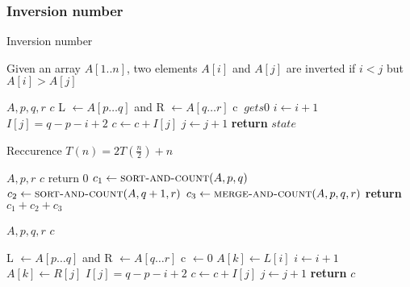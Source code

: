 \documentclass[../../main/main.tex]{subfiles}
\begin{document}
\subsubsection{Inversion number}
\begin{definition}{Inversion number}

	Given an array $A[1..n]$, two elements $A[i]$ and  $A[j]$ are inverted if $i<j$ but  $A[i] > A[j]$

\end{definition}
\begin{algorithm}
	\algrenewcommand{}
	\algrenewcommand{}
	\caption{Count number of inversion}
	\label{alg:}
	\begin{algorithmic}[1]
		\Require $A,p,q,r$
		\Ensure $c$
		\State L $\gets A[p\ldots q]$ and R $\gets A[q \ldots r]$
		\State c $\ gets 0$
		\State $i \gets i+1$
		\Else
		\State $I[j] = q - p - i + 2 $
		\State  $c \gets c + I[j]$
		\State  $j \gets j+1$
		\EndIf
		\EndWhile
		\State \textbf{return} $state$
	\end{algorithmic}
\end{algorithm}

Reccurence $T(n) = 2T(\frac{n}{2}) + n$


\begin{algorithm}[H]
	\algrenewcommand{}
	\algrenewcommand{}
	\caption{Sort and count}
	\label{alg:}
	\begin{algorithmic}[1]
		\Require $A, p, r$
		\Ensure $c$
		\State return 0
		\EndIf
		\State $c_{1} \gets \Call{sort-and-count}{A,p,q}$
		\State $c_{2} \gets \Call{sort-and-count}{A,q+1,r}$
		\State $c_{3} \gets \Call{merge-and-count}{A,p,q, r}$
		\State \textbf{return} $c_1 + c_2 + c_3$
	\end{algorithmic}
\end{algorithm}
\begin{algorithm}[H]
	\algrenewcommand{}
	\algrenewcommand{}
	\caption{Merge and count}
	\label{alg:}
	\begin{algorithmic}[1]
		\Require $A,p,q,r$
		\Ensure $c$

		\State L $\gets A[p\ldots q]$ and R $\gets A[q \ldots r]$
		\State c $\gets 0$
		\State $A[k] \gets L[i]$
		\State $i \gets i+1$
		\Else
		\State $A[k] \gets R[j]$
		\State $I[j] = q - p - i + 2 $
		\State  $c \gets c + I[j]$
		\State  $j \gets j+1$
		\EndIf
		\EndFor
		\State \textbf{return} $c$
	\end{algorithmic}
\end{algorithm}
\end{document}

